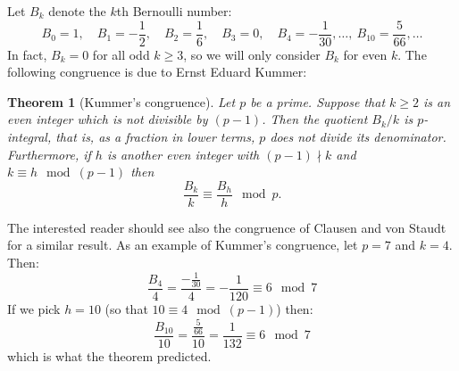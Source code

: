 \documentclass[12pt]{article}
\newtheorem*{thm}{Theorem}
\theoremstyle{definition}
\begin{document}
Let $B_k$ denote the $k$th Bernoulli number:
$$B_0=1,\quad B_1=-\frac{1}{2},\quad B_2=\frac{1}{6},\quad B_3=0,\quad B_4=-\frac{1}{30},\ldots,\ B_{10}=\frac{5}{66},\ldots $$
In fact, $B_k=0$ for all odd $k\geq 3$, so we will only consider $B_k$ for even $k$. The following congruence is due to Ernst Eduard Kummer:

\begin{thm}[Kummer's congruence]
Let $p$ be a prime. Suppose that $k\geq 2$ is an even integer which is not divisible by $(p-1)$. Then the quotient $B_k/k$ is $p$-integral, that is, as a fraction in lower terms, $p$ does not divide its denominator. Furthermore, if $h$ is another even integer with $(p-1)\nmid k$ and $k\equiv h \mod (p-1)$ then
$$\frac{B_k}{k}\equiv \frac{B_h}{h} \mod p.$$ 

\end{thm}

The interested reader should see also the congruence of Clausen and von Staudt for a similar result. As an example of Kummer's congruence, let $p=7$ and $k=4$. Then:
$$\frac{B_4}{4}=\frac{-\frac{1}{30}}{4}=-\frac{1}{120}\equiv 6 \mod 7$$
If we pick $h=10$ (so that $10\equiv 4 \mod (p-1)$) then:
$$\frac{B_{10}}{10}=\frac{\frac{5}{66}}{10}=\frac{1}{132}\equiv 6 \mod 7$$
which is what the theorem predicted.
\end{document}
